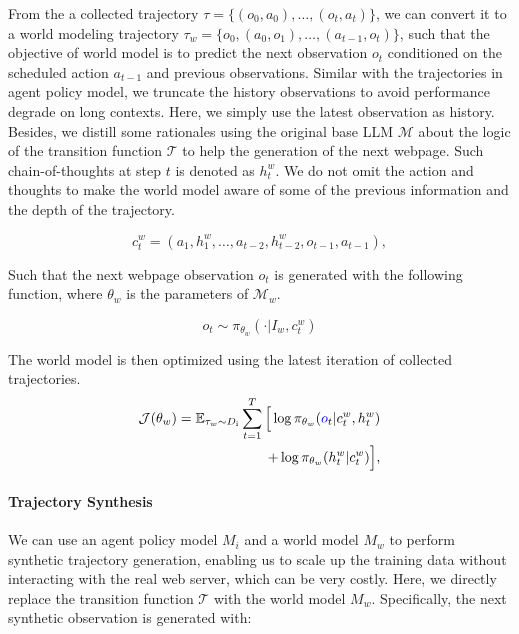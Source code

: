 \documentclass[11pt]{article}
\newcommand{\finalcopy}[1]{\textcolor{blue}{#1}}
\begin{document}
From the a collected trajectory $\tau = \{(o_0,a_0),\ldots,(o_t,a_t)\}$, we can convert it to a world modeling trajectory $\tau_w = \{o_0, (a_0, o_1),\ldots,(a_{t-1},o_t)\}$, such that the objective of world model is to predict the next observation $o_t$ conditioned on the scheduled action $a_{t-1}$ and previous observations. 
Similar with the trajectories in agent policy model, we truncate the history observations to avoid performance degrade on long contexts. 
Here, we simply use the latest observation as history.
Besides, we distill some rationales using the original base LLM $\mathcal{M}$ about the logic of the transition function $\mathcal{T}$ to help the generation of the next webpage. 
Such chain-of-thoughts at step $t$ is denoted as $h^w_t$.
We do not omit the action and thoughts to make the world model aware of some of the previous information and the depth of the trajectory.
\vspace{-1em}

\begin{equation}
c^w_t = (a_1, h^w_1, \dots, a_{t-2}, h^w_{t-2}, o_{t-1}, a_{t-1}), 
\end{equation}

Such that the next webpage observation $o_t$ is generated with the following function, where $\theta_w$ is the parameters of $\mathcal{M}_w$.

\begin{equation}
o_t \sim \pi_{\theta_w}(\cdot|I_w, c^w_t)
\end{equation}

The world model is then optimized using the latest iteration of collected trajectories.
\vspace{-1em}
\begin{align}\label{equation:J-wm}
    \mathcal{J}(\theta_w) = \mathbb{E}_{\tau_w \sim D_{\text{i}}} \sum_{t=1}^T \Big[\log \pi_{\theta_w}(\finalcopy{o}_t |  c^w_t, h^w_t)  \nonumber \\
    + \log \pi_{\theta_w}(h^w_t | c^w_t)\Big],
\end{align}


\paragraph{Trajectory Synthesis}

We can use an agent policy model $M_{i}$ and a world model $M_{w}$ to perform synthetic trajectory generation, enabling us to scale up the training data without interacting with the real web server, which can be very costly.
Here, we directly replace the transition function $\mathcal{T}$ with the world model $M_{w}$. Specifically, the next synthetic observation is generated with:
\end{document}
